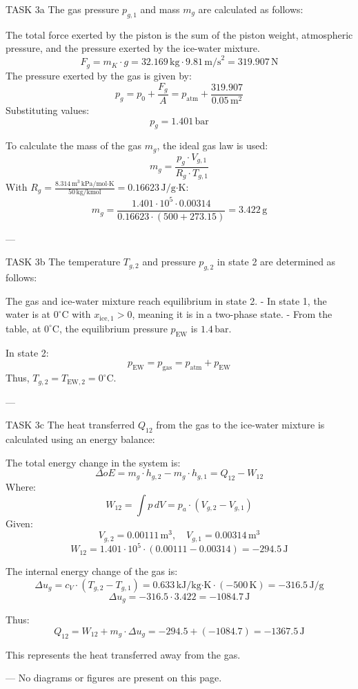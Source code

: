 TASK 3a  
The gas pressure \( p_{g,1} \) and mass \( m_g \) are calculated as follows:  

The total force exerted by the piston is the sum of the piston weight, atmospheric pressure, and the pressure exerted by the ice-water mixture.  
\[
F_g = m_K \cdot g = 32.169 \, \text{kg} \cdot 9.81 \, \text{m/s}^2 = 319.907 \, \text{N}
\]  
The pressure exerted by the gas is given by:  
\[
p_g = p_0 + \frac{F_g}{A} = p_{\text{atm}} + \frac{319.907}{0.05 \, \text{m}^2}
\]  
Substituting values:  
\[
p_g = 1.401 \, \text{bar}
\]  

To calculate the mass of the gas \( m_g \), the ideal gas law is used:  
\[
m_g = \frac{p_g \cdot V_{g,1}}{R_g \cdot T_{g,1}}
\]  
With \( R_g = \frac{8.314 \, \text{m}^3 \, \text{kPa}/\text{mol·K}}{50 \, \text{kg/kmol}} = 0.16623 \, \text{J/g·K} \):  
\[
m_g = \frac{1.401 \cdot 10^5 \cdot 0.00314}{0.16623 \cdot (500 + 273.15)} = 3.422 \, \text{g}
\]  

---

TASK 3b  
The temperature \( T_{g,2} \) and pressure \( p_{g,2} \) in state 2 are determined as follows:  

The gas and ice-water mixture reach equilibrium in state 2.  
- In state 1, the water is at \( 0^\circ\text{C} \) with \( x_{\text{ice},1} > 0 \), meaning it is in a two-phase state.  
- From the table, at \( 0^\circ\text{C} \), the equilibrium pressure \( p_{\text{EW}} \) is \( 1.4 \, \text{bar} \).  

In state 2:  
\[
p_{\text{EW}} = p_{\text{gas}} = p_{\text{atm}} + p_{\text{EW}}
\]  
Thus, \( T_{g,2} = T_{\text{EW},2} = 0^\circ\text{C} \).  

---

TASK 3c  
The heat transferred \( Q_{12} \) from the gas to the ice-water mixture is calculated using an energy balance:  

The total energy change in the system is:  
\[
\Delta oE = m_g \cdot h_{g,2} - m_g \cdot h_{g,1} = Q_{12} - W_{12}
\]  
Where:  
\[
W_{12} = \int p \, dV = p_a \cdot (V_{g,2} - V_{g,1})
\]  
Given:  
\[
V_{g,2} = 0.00111 \, \text{m}^3, \quad V_{g,1} = 0.00314 \, \text{m}^3
\]  
\[
W_{12} = 1.401 \cdot 10^5 \cdot (0.00111 - 0.00314) = -294.5 \, \text{J}
\]  

The internal energy change of the gas is:  
\[
\Delta u_g = c_V \cdot (T_{g,2} - T_{g,1}) = 0.633 \, \text{kJ/kg·K} \cdot (-500 \, \text{K}) = -316.5 \, \text{J/g}
\]  
\[
\Delta u_g = -316.5 \cdot 3.422 = -1084.7 \, \text{J}
\]  

Thus:  
\[
Q_{12} = W_{12} + m_g \cdot \Delta u_g = -294.5 + (-1084.7) = -1367.5 \, \text{J}
\]  

This represents the heat transferred away from the gas.  

---  
No diagrams or figures are present on this page.